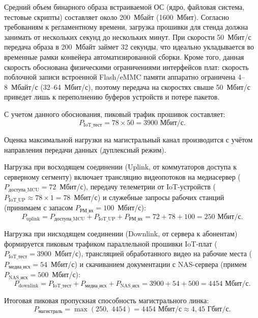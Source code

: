 \documentclass{bmstu}
\begin{document}
Средний объем бинарного образа встраиваемой ОС (ядро, файловая система, тестовые скрипты) составляет около 200~Мбайт (1600~Мбит). Согласно требованиям к регламентному времени, загрузка прошивки для стенда должна занимать от нескольких секунд до нескольких минут. При скорости 50~Мбит/с передача образа в 200~Мбайт займет 32 секунды, что идеально укладывается во временные рамки конвейера автоматизированной сборки. Кроме того, данная скорость обоснована физическими ограничениями интерфейсов плат: скорость поблочной записи встроенной Flash/eMMC памяти аппаратно ограничена 4--8~Мбайт/с (32--64~Мбит/с), поэтому передача на скоростях свыше 50~Мбит/с приведет лишь к переполнению буферов устройств и потере пакетов.

С учетом данного обоснования, пиковый трафик прошивок составляет:
\begin{equation}
    P_{\text{IoT\_тест}} = 78 \times 50 = 3900 \text{ Мбит/с}.
    \label{eq:p_iot}
\end{equation}

Оценка максимальной нагрузки на магистральный канал производится с учётом направления передачи данных (дуплексный режим).

Нагрузка при восходящем соединении (Uplink, от коммутаторов доступа к серверному сегменту) включает трансляцию видеопотоков на медиасервер ($P_{\text{доступа\_MCU}} = 72$~Мбит/с), передачу телеметрии от IoT-устройств ($P_{\text{IoT\_UP}} \approx 78 \times 1 = 78$~Мбит/с) и служебные запросы рабочих станций (принимаем с запасом $P_{\text{РМ\_вх}} = 100$~Мбит/с):
\begin{equation}
    P_{\text{uplink}} = P_{\text{доступа\_MCU}} + P_{\text{IoT\_UP}} + P_{\text{РМ\_вх}} = 72 + 78 + 100 = 250 \text{ Мбит/с}.
    \label{eq:p_uplink}
\end{equation}

Нагрузка при нисходящем соединении (Downlink, от сервера к абонентам) формируется пиковым трафиком параллельной прошивки IoT-плат ($P_{\text{IoT\_тест}} = 3900$~Мбит/с), трансляцией обработанного видео на рабочие места ($P_{\text{медиа\_исх}} = 54$~Мбит/с) и скачиванием документации с NAS-сервера (примем $P_{\text{NAS\_исх}} = 500$~Мбит/с):
\begin{equation}
    P_{\text{downlink}} = P_{\text{IoT\_тест}} + P_{\text{медиа\_исх}} + P_{\text{NAS\_исх}} = 3900 + 54 + 500 = 4454 \text{ Мбит/с}.
    \label{eq:p_downlink}
\end{equation}

Итоговая пиковая пропускная способность магистрального линка:
\begin{equation}
    P_{\text{магистраль}} = \max(250,\; 4454) = 4454 \text{ Мбит/с} \approx 4{,}45 \text{ Гбит/с}.
    \label{eq:p_core}
\end{equation}
\end{document}
